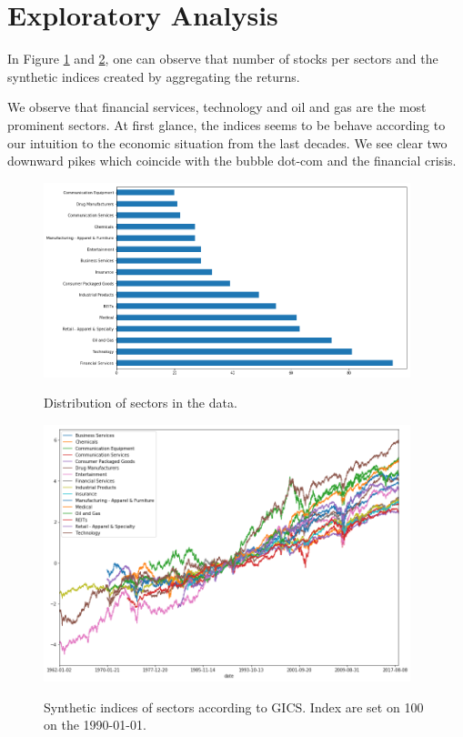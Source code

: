 \documentclass[a4paper,twoside]{article}
\begin{document}
\section{Exploratory Analysis}
\label{sec:org271634d}

In Figure \ref{fig:distribution-sectors} and \ref{fig:gics-level}, one can
observe that number of stocks per sectors and the synthetic indices created by
aggregating the returns.

We observe that financial services, technology and oil and gas are the most
prominent sectors. At first glance, the indices seems to be behave according to
our intuition to the economic situation from the last decades. We see clear two
downward pikes which coincide with the bubble dot-com and the financial crisis.

\begin{figure}    
\begin{center}
  \label{fig:distribution-sectors}
  \includegraphics[width=0.95\textwidth]{figures/sectors_distribution}
  \caption{Distribution of sectors in the data.}
  \end{center}
\end{figure}

\begin{figure}    
\begin{center}
  \label{fig:gics-level}
  \includegraphics[width=0.95\textwidth]{figures/indexes_level}
  \caption{Synthetic indices of sectors according to GICS. Index are set on 100 on the 1990-01-01.}
  \end{center}
\end{figure}
\end{document}
